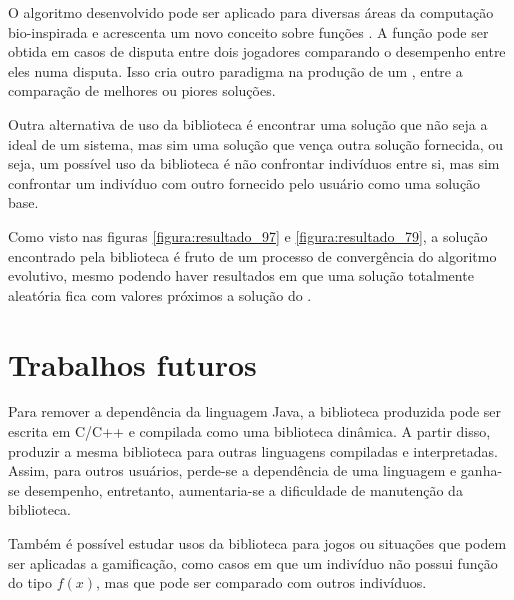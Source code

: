 O algoritmo desenvolvido pode ser aplicado para diversas áreas da computação bio-inspirada e acrescenta um novo conceito sobre funções \fitness. A função \fitness pode ser obtida em casos de disputa entre dois jogadores comparando o desempenho entre eles numa disputa. Isso cria outro paradigma na produção de um \SE, entre a comparação de melhores ou piores soluções.

Outra alternativa de uso da biblioteca é encontrar uma solução que não seja a ideal de um sistema, mas sim uma solução que vença outra solução fornecida, ou seja, um possível uso da biblioteca é não confrontar indivíduos entre si, mas sim confrontar um indivíduo com outro fornecido pelo usuário como uma solução base.

Como visto nas figuras \ref{figura:resultado_97} e \ref{figura:resultado_79}, a solução encontrado pela biblioteca é fruto de um processo de convergência do algoritmo evolutivo, mesmo podendo haver resultados em que uma solução totalmente aleatória fica com valores próximos a solução do \SE.

\section{Trabalhos futuros}

Para remover a dependência da linguagem Java, a biblioteca produzida pode ser escrita em C/C++ e compilada como uma biblioteca dinâmica. A partir disso, produzir a mesma biblioteca para outras linguagens compiladas e interpretadas. Assim, para outros usuários, perde-se a dependência de uma linguagem e ganha-se desempenho, entretanto, aumentaria-se a dificuldade de manutenção da biblioteca.

Também é possível estudar usos da biblioteca para jogos ou situações que podem ser aplicadas a gamificação, como casos em que um indivíduo não possui função \fitness do tipo $f(x)$, mas que pode ser comparado com outros indivíduos.